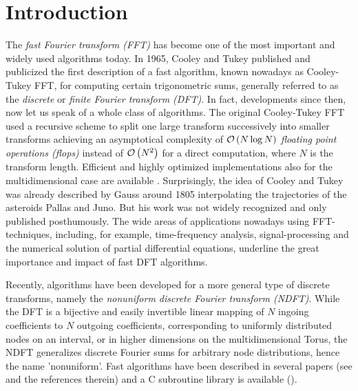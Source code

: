 \chapter{Introduction}
\label{Introduction}

The \emph{fast Fourier transform (FFT)} has become one of the most important 
and widely used algorithms today. In 1965, Cooley and Tukey \cite{cotu} published
and publicized the first description of a fast algorithm, known nowadays as Cooley-Tukey 
FFT, for computing certain trigonometric sums, generally referred to as the 
\emph{discrete} or \emph{finite Fourier transform (DFT)}. In fact, developments since then, now
let us speak of a whole class of algorithms. The original Cooley-Tukey FFT
used a recursive scheme to split one large transform successively into
smaller transforms achieving an asymptotical complexity of 
$\mathcal{O}\left(N \log N\right)$ \emph{floating point operations (flops)} instead of
$\mathcal{O}\left(N^2\right)$ for a direct computation, where $N$ is the transform length. 
Efficient and highly optimized implementations also for the
multidimensional case are available \cite{fftw}.
Surprisingly, the idea of Cooley and Tukey was already described by Gauss around
1805 \cite{hejobu} interpolating the trajectories of the asteroids Pallas 
and Juno. But his work was not widely recognized and only published posthumously.
The wide areas of applications nowadays using FFT-techniques, including, for example, 
time-frequency analysis, signal-processing and the numerical solution of 
partial differential equations, underline the great importance and impact of fast
DFT algorithms.

Recently, algorithms have been developed for a more general type of discrete 
transforms, namely the \emph{nonuniform discrete Fourier transform (NDFT)}. 
While the DFT is a bijective and easily invertible linear mapping of $N$ 
ingoing coefficients to $N$ outgoing coefficients, corresponding to
uniformly distributed nodes on an interval, or in higher dimensions on 
the multidimensional Torus, the NDFT generalizes
discrete Fourier sums for arbitrary node distributions, hence the name
'nonuniform'. Fast algorithms have been described in several papers 
(see \cite{postta01} and the references therein) and a C subroutine library is available 
(\cite{kupo02C}).

